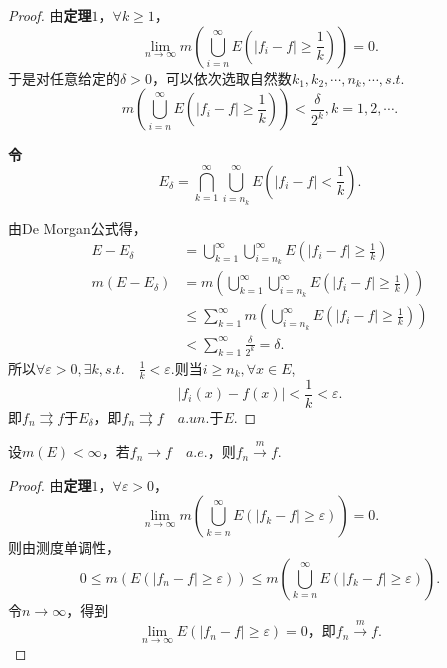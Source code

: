 \documentclass[bwprint, withoutpreface]{cumcmthesis}
\begin{document}
\begin{proof}
	由\textbf{定理$1$}，$\forall k \geqslant 1$，
	\begin{equation*}
		\lim_{n \to \infty}{m(\bigcup_{i = n}^{\infty}{E(|f_i - f| \geqslant \frac{1}{k})})} = 0.	
	\end{equation*}
	于是对任意给定的$\delta > 0$，可以依次选取自然数$k_1, k_2, \cdots, n_k, \cdots, s.t.$
	\begin{equation*}
		m(\bigcup_{i = n}^{\infty}{E(|f_i - f| \geqslant \frac{1}{k})}) < \frac{\delta}{2^k}, k = 1, 2, \cdots.
	\end{equation*}
	
	\textbf{令\[E_{\delta} = \bigcap_{k = 1}^{\infty}{\bigcup_{i = n_k}^{\infty}{E(|f_i - f| < \frac{1}{k})}}.\]}
	
	由De Morgan公式得，
	\begin{align*}
		E - E_{\delta} & = \bigcup_{k = 1}^{\infty}{\bigcup_{i = n_k}^{\infty}{E(|f_i - f| \geqslant \frac{1}{k})}} \\
		m(E - E_{\delta}) & = m(\bigcup_{k = 1}^{\infty}{\bigcup_{i = n_k}^{\infty}{E(|f_i - f| \geqslant \frac{1}{k})}}) \\
						  & \leqslant \sum_{k = 1}^{\infty}{m(\bigcup_{i = n_k}^{\infty}{E(|f_i - f| \geqslant \frac{1}{k})})} \\
						  & < \sum_{k = 1}^{\infty}{\frac{\delta}{2^k}} = \delta. 
	\end{align*}
	所以$\forall \varepsilon > 0, \exists k, s.t. \quad \frac{1}{k} < \varepsilon$.则当$i \geqslant n_k, \forall x \in E$,
	\begin{equation*}
		|f_i(x) - f(x)| < \frac{1}{k} < \varepsilon.
	\end{equation*}
	即$f_n \rightrightarrows f$于$E_{\delta}$，即$f_n \rightrightarrows f \quad a.un.\mbox{于}E$.
\end{proof}

\begin{theorem}
	设$m(E) < \infty$，若$f_n \to f \quad a.e.$，则$f_n \stackrel{m}{\longrightarrow} f$.
\end{theorem}

\begin{proof}
	由\textbf{定理$1$}，$\forall \varepsilon > 0$，
	\begin{equation*}
		\lim_{n \to \infty}{m(\bigcup_{k = n}^{\infty}{E(|f_k - f| \geqslant \varepsilon)})} = 0.
	\end{equation*}
	则由测度单调性，
	\begin{equation*}
		0 \leqslant m(E(|f_n - f| \geqslant \varepsilon)) \leqslant m(\bigcup_{k = n}^{\infty}{E(|f_k - f| \geqslant \varepsilon)}).
	\end{equation*}
	令$n \to \infty$，得到\[\lim_{n \to \infty}{E(|f_n - f| \geqslant \varepsilon)} = 0 \mbox{，即} f_n \stackrel{m}{\longrightarrow} f.\]
\end{proof}
\end{document}
